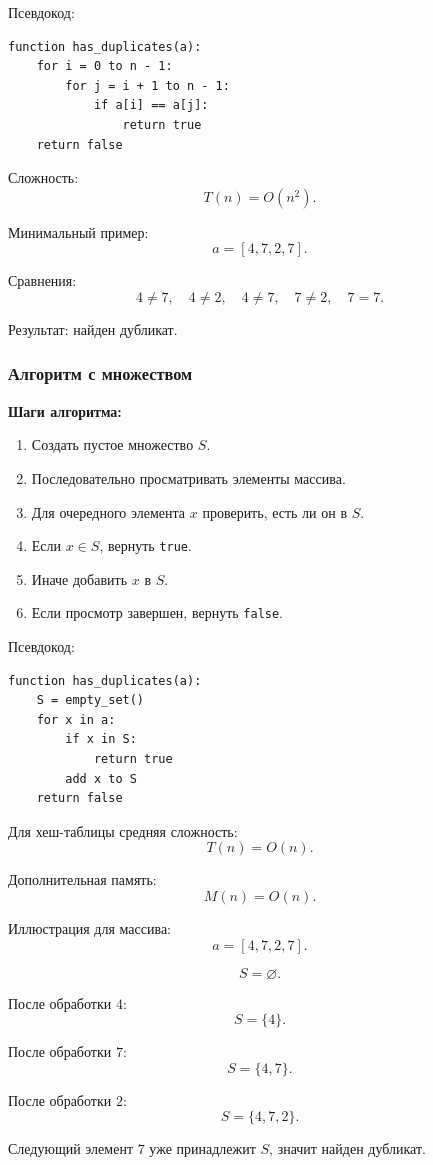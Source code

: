 \documentclass[12pt,a4paper]{article}
\begin{document}
Псевдокод:
\begin{verbatim}
function has_duplicates(a):
    for i = 0 to n - 1:
        for j = i + 1 to n - 1:
            if a[i] == a[j]:
                return true
    return false
\end{verbatim}

Сложность:
\[
T(n) = O(n^2).
\]

Минимальный пример:
\[
a = [4, 7, 2, 7].
\]

Сравнения:
\[
4 \neq 7,\quad 4 \neq 2,\quad 4 \neq 7,\quad 7 \neq 2,\quad 7 = 7.
\]

Результат: найден дубликат.

\subsubsection{Алгоритм с множеством}

\textbf{Шаги алгоритма:}
\begin{enumerate}
    \item Создать пустое множество $S$.
    \item Последовательно просматривать элементы массива.
    \item Для очередного элемента $x$ проверить, есть ли он в $S$.
    \item Если $x \in S$, вернуть \texttt{true}.
    \item Иначе добавить $x$ в $S$.
    \item Если просмотр завершен, вернуть \texttt{false}.
\end{enumerate}

Псевдокод:
\begin{verbatim}
function has_duplicates(a):
    S = empty_set()
    for x in a:
        if x in S:
            return true
        add x to S
    return false
\end{verbatim}

Для хеш-таблицы средняя сложность:
\[
T(n) = O(n).
\]

Дополнительная память:
\[
M(n) = O(n).
\]

Иллюстрация для массива:
\[
a = [4, 7, 2, 7].
\]

\[
S = \varnothing.
\]

После обработки $4$:
\[
S = \{4\}.
\]

После обработки $7$:
\[
S = \{4,7\}.
\]

После обработки $2$:
\[
S = \{4,7,2\}.
\]

Следующий элемент $7$ уже принадлежит $S$, значит найден дубликат.
\end{document}
